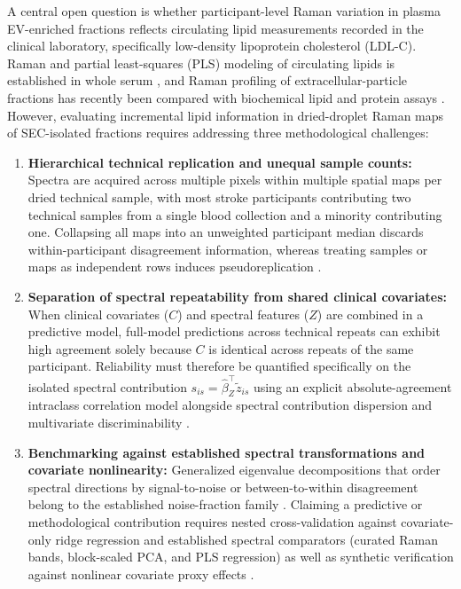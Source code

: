 \documentclass[preprint,12pt]{elsarticle}
\begin{document}
A central open question is whether participant-level Raman variation in plasma EV-enriched fractions reflects circulating lipid measurements recorded in the clinical laboratory, specifically low-density lipoprotein cholesterol (LDL-C). Raman and partial least-squares (PLS) modeling of circulating lipids is established in whole serum \cite{silveira2017}, and Raman profiling of extracellular-particle fractions has recently been compared with biochemical lipid and protein assays \cite{bonizzi2025}. However, evaluating incremental lipid information in dried-droplet Raman maps of SEC-isolated fractions requires addressing three methodological challenges:
\begin{enumerate}
    \item \textbf{Hierarchical technical replication and unequal sample counts:} Spectra are acquired across multiple pixels within multiple spatial maps per dried technical sample, with most stroke participants contributing two technical samples from a single blood collection and a minority contributing one. Collapsing all maps into an unweighted participant median discards within-participant disagreement information, whereas treating samples or maps as independent rows induces pseudoreplication \cite{hurlbert1984, lazic2010}.
    \item \textbf{Separation of spectral repeatability from shared clinical covariates:} When clinical covariates ($C$) and spectral features ($Z$) are combined in a predictive model, full-model predictions across technical repeats can exhibit high agreement solely because $C$ is identical across repeats of the same participant. Reliability must therefore be quantified specifically on the isolated spectral contribution $s_{is} = \widehat{\beta}_Z^\top \tilde{z}_{is}$ using an explicit absolute-agreement intraclass correlation model \cite{koo2016, koo2017erratum} alongside spectral contribution dispersion and multivariate discriminability \cite{bridgeford2021}.
    \item \textbf{Benchmarking against established spectral transformations and covariate nonlinearity:} Generalized eigenvalue decompositions that order spectral directions by signal-to-noise or between-to-within disagreement belong to the established noise-fraction family \cite{green1988}. Claiming a predictive or methodological contribution requires nested cross-validation against covariate-only ridge regression and established spectral comparators (curated Raman bands, block-scaled PCA, and PLS regression) as well as synthetic verification against nonlinear covariate proxy effects \cite{bates2024, bengio2004}.
\end{enumerate}
\end{document}
